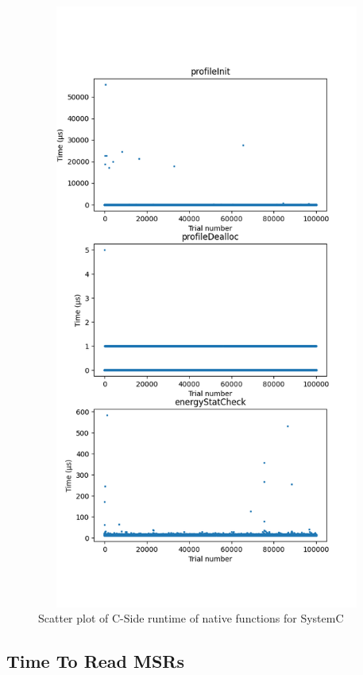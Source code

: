 \documentclass{article}
\begin{document}
    \begin{figure}[H]
    	\centering
    	\includegraphics[width=17cm,height=20cm,keepaspectratio]{RuntimeResults_SystemC/CFunctions/runtime-scatters.png}
    	\caption{Scatter plot of C-Side runtime of native functions for SystemC}
    	\label{fig:C-Functions|SystemC}
    \end{figure}

\subsection{Time To Read MSRs}
\end{document}
